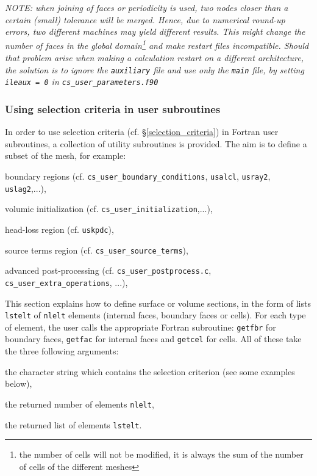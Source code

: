 {{{{\em NOTE: when joining of faces or periodicity is used, two nodes closer
than a certain (small) tolerance will be merged. Hence, due to numerical
round-up errors, two different machines may yield different results.
This might change the number of faces in the global
domain\footnote{the number of cells will not be modified, it is always the sum of the
number of cells of the different meshes} and make restart files
incompatible. Should that problem arise when making a calculation restart on a
different architecture, the solution is to ignore the \texttt{auxiliary}
file and use only the \texttt{main} file, by setting \texttt{ileaux = 0}
in \texttt{cs\_user\_parameters.f90}}

\subsubsection{Using selection criteria in user subroutines}
\label{fvm_selector}

In order to use selection criteria (cf. \S\ref{selection_criteria}) in Fortran
user subroutines, a collection of utility subroutines is provided. The aim is to
define a subset of the mesh, for example:

\begin{list}{-}{}
\item boundary regions (cf. \texttt{cs\_user\_boundary\_conditions}, \texttt{usalcl},
\texttt{usray2}, \texttt{uslag2},...),
\item volumic initialization (cf. \texttt{cs\_user\_initialization},...),
\item head-loss region (cf. \texttt{uskpdc}),
\item source terms region (cf. \texttt{cs\_user\_source\_terms}),
\item advanced post-processing (cf. \texttt{cs\_user\_postprocess.c},
      \texttt{cs\_user\_extra\_operations}, ...),
\end{list}

This section explains how to define surface or volume sections,
in the form of lists \texttt{lstelt} of \texttt{nlelt} elements
(internal faces, boundary faces or cells).
For each type of element, the user calls the appropriate Fortran
subroutine: \texttt{getfbr}
for boundary faces, \texttt{getfac} for internal faces
and \texttt{getcel} for cells. All of these take
the three following arguments:
\begin{list}{-}{}
\item the character string which contains the selection
      criterion (see some examples below), 
\item the returned number of elements \texttt{nlelt}, 
\item the returned list of elements \texttt{lstelt}. 
\end{list}

}}}
